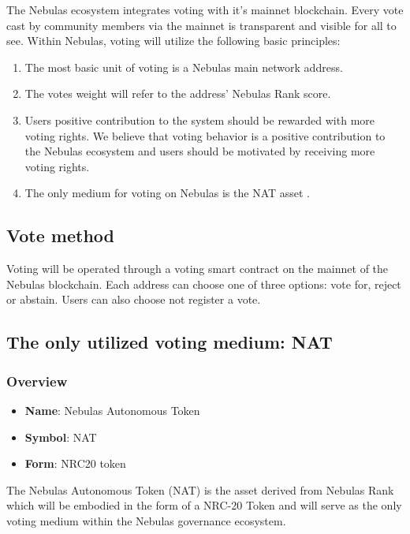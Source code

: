 The Nebulas ecosystem integrates voting with it's mainnet blockchain. Every vote cast by community members via the mainnet is transparent and visible for all to see. Within Nebulas, voting will utilize the following basic principles:

\begin{enumerate}
	\item The most basic unit of voting is a Nebulas main network address.
	\item The votes weight will refer to the address' Nebulas Rank score.
	\item Users positive contribution to the system should be rewarded with more voting rights. We believe that voting behavior is a positive contribution to the Nebulas ecosystem and users should be motivated by receiving more voting rights.
	\item The only medium for voting on Nebulas is the NAT asset .
\end{enumerate}

\subsection{Vote method}

Voting will be operated through a voting smart contract on the mainnet of the Nebulas blockchain. Each address can choose one of three options: vote for, reject or abstain. Users can also choose not register a vote.

\subsection{The only utilized voting medium: NAT}

\label{nat}

\subsubsection{Overview}

\begin{itemize}
	\item \textbf{Name}: Nebulas Autonomous Token
	\item \textbf{Symbol}: NAT
	\item \textbf{Form}: NRC20 token
\end{itemize}

The Nebulas Autonomous Token (NAT) is the asset derived from Nebulas Rank which will be embodied in the form of a NRC-20 Token and will serve as the only voting medium within the Nebulas governance ecosystem.

